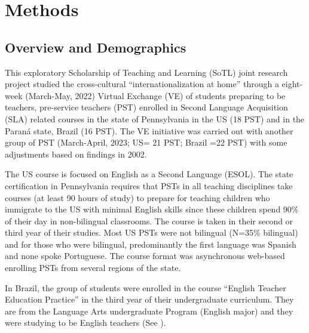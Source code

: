 \section{Methods}\label{sec-methods}
\subsection{Overview and Demographics}\label{sub-sec-overviewanddemographics}

This exploratory Scholarship of Teaching and Learning (SoTL) joint
research project studied the cross-cultural \enquote{internationalization at
home} through a eight-week (March-May, 2022) Virtual Exchange (VE) of
students preparing to be teachers, pre-service teachers (PST) enrolled in
Second Language Acquisition (SLA) related courses in the state of
Pennsylvania in the US (18 PST) and in the Paraná state, Brazil (16
PST). The VE initiative was carried out with another group of PST
(March-April, 2023; US= 21 PST; Brazil =22 PST) with
some adjustments based on findings in 2002.

The US course is focused on English as a Second Language (ESOL). The
state certification in Pennsylvania requires that PSTs in all teaching
disciplines take courses (at least 90 hours of study) to prepare for
teaching children who immigrate to the US with minimal English skills
since these children spend 90\% of their day in non-bilingual
classrooms. The course is taken in their second or third year of their
studies. Most US PSTs were not bilingual (N=35\% bilingual) and for
those who were bilingual, predominantly the first language was Spanish
and none spoke Portuguese. The course format was asynchronous web-based
enrolling PSTs from several regions of the state.

In Brazil, the group of students were enrolled in the course \enquote{English
Teacher Education Practice} in the third year of their undergraduate
curriculum. They are from the Language Arts undergraduate Program
(English major) and they were studying to be English teachers (See ).
		
		

